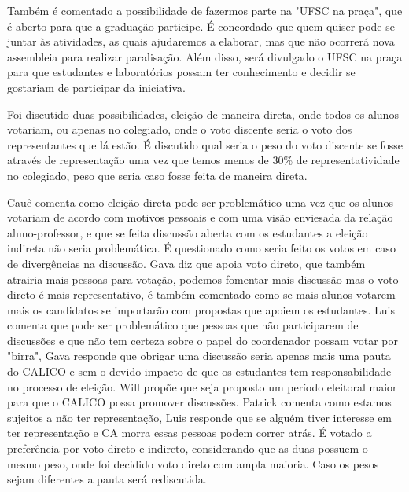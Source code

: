 \documentclass{ata-calico}
\begin{document}
Também é comentado a possibilidade de fazermos parte na "UFSC na praça", que é aberto para que a graduação participe.
\bigbreak
É concordado que quem quiser pode se juntar às atividades, as quais ajudaremos a elaborar, mas que não ocorrerá nova assembleia para realizar paralisação. Além disso, será divulgado o UFSC na praça para que estudantes e laboratórios possam ter conhecimento e decidir se gostariam de participar da iniciativa.

Foi discutido duas possibilidades, eleição de maneira direta, onde todos os alunos votariam, ou apenas no colegiado, onde o voto discente seria o voto dos representantes que lá estão. É discutido qual seria o peso do voto discente se fosse através de representação uma vez que temos menos de 30\% de representatividade no colegiado, peso que seria caso fosse feita de maneira direta.

Cauê comenta como eleição direta pode ser problemático uma vez que os alunos votariam de acordo com motivos pessoais e com uma visão enviesada da relação aluno-professor, e que se feita discussão aberta com os estudantes a eleição indireta não seria problemática. É questionado como seria feito os votos em caso de divergências na discussão. Gava diz que apoia voto direto, que também atrairia mais pessoas para votação, podemos fomentar mais discussão mas o voto direto é mais representativo, é também comentado como se mais alunos votarem mais os candidatos se importarão com propostas que apoiem os estudantes. Luis comenta que pode ser problemático que pessoas que não participarem de discussões e que não tem certeza sobre o papel do coordenador possam votar por "birra", Gava responde que obrigar uma discussão seria apenas mais uma pauta do CALICO e sem o devido impacto de que os estudantes tem responsabilidade no processo de eleição. Will propõe que seja proposto um período eleitoral maior para que o CALICO possa promover discussões. Patrick comenta como estamos sujeitos a não ter representação, Luis responde que se alguém tiver interesse em ter representação e CA morra essas pessoas podem correr atrás.
\bigbreak
É votado a preferência por voto direto e indireto, considerando que as duas possuem o mesmo peso, onde foi decidido voto direto com ampla maioria. Caso os pesos sejam diferentes a pauta será rediscutida. 
\end{document}
